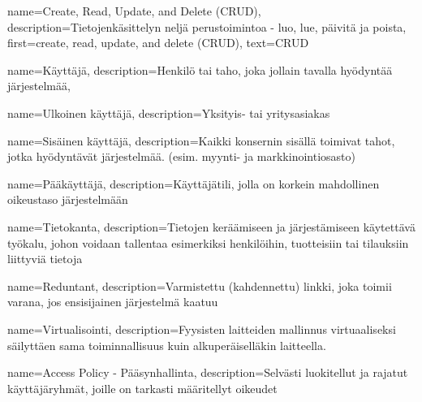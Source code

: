     {
    name={Create, Read, Update, and Delete (CRUD)},
    description={Tietojenkäsittelyn neljä perustoimintoa - luo, lue, päivitä ja poista},
    first={create, read, update, and delete (CRUD)},
    text={CRUD}
    }

    {
    name={Käyttäjä},
    description={Henkilö tai taho, joka jollain tavalla hyödyntää järjestelmää},
    }

    {
    name={Ulkoinen käyttäjä},
    description={Yksityis- tai yritysasiakas}
    }

    {
    name={Sisäinen käyttäjä},
    description={Kaikki konsernin sisällä toimivat tahot, jotka hyödyntävät järjestelmää. (esim. myynti- ja markkinointiosasto)}
    }

    {
    name={Pääkäyttäjä},
    description={Käyttäjätili, jolla on korkein mahdollinen oikeustaso järjestelmään}
    }

    {
    name={Tietokanta},
    description={Tietojen keräämiseen ja järjestämiseen käytettävä työkalu, johon voidaan tallentaa esimerkiksi henkilöihin, tuotteisiin tai tilauksiin liittyviä tietoja \cite{kurssi}}
    }

    {
    name={Reduntant},
    description={Varmistettu (kahdennettu) linkki, joka toimii varana, jos ensisijainen järjestelmä kaatuu \cite{kurssi}}
    }

    {
    name={Virtualisointi},
    description={Fyysisten laitteiden mallinnus virtuaaliseksi säilyttäen sama toiminnallisuus kuin alkuperäiselläkin laitteella.}
    }

    {
    name={Access Policy - Pääsynhallinta},
    description={Selvästi luokitellut ja rajatut käyttäjäryhmät, joille on tarkasti määritellyt oikeudet \cite{sommerville}}
    }

        


